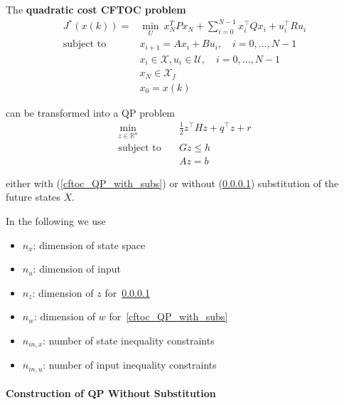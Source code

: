\newpar{}

The \textbf{quadratic cost CFTOC problem}
\begin{align*}
    J^*(x(k)) =            & \min_U \: x_N^T P x_N + \sum_{i=0}^{N-1}x_i^\top Q x_i + u_i^\top R u_i \\
    \text{subject to}\quad & x_{i+1} = Ax_i +Bu_i, \quad i = 0, \ldots, N-1                          \\
                           & x_i \in \mathcal{X}, u_i \in \mathcal{U}, \quad i = 0, \ldots, N-1      \\
                           & x_N \in \mathcal{X}_f                                                   \\
                           & x_0 = x(k)
\end{align*}

can be transformed into a QP problem
\begin{align*}
    \min_{z\in\mathbb{R}^n} & \frac{1}{2}z^\top Hz + q^\top z + r \\
    \text{subject to}\quad  & Gz \leq h                           \\
                            & Az = b
\end{align*}

either with (\ref{cftoc_QP_with_subs}) or without (\ref{cftoc_QP_without_subs}) substitution of the future states $X$.

\newpar{}

In the following we use
\begin{itemize}
    \item $n_x$: dimension of state space
    \item $n_u$: dimension of input
    \item $n_z$: dimension of $z$ for~\ref{cftoc_QP_without_subs}
    \item $n_w$: dimension of $w$ for~\ref{cftoc_QP_with_subs}
    \item $n_{in,x}$: number of state inequality constraints
    \item $n_{in,u}$: number of input inequality constraints
\end{itemize}

\paragraph{Construction of QP Without Substitution}\label{cftoc_QP_without_subs}

